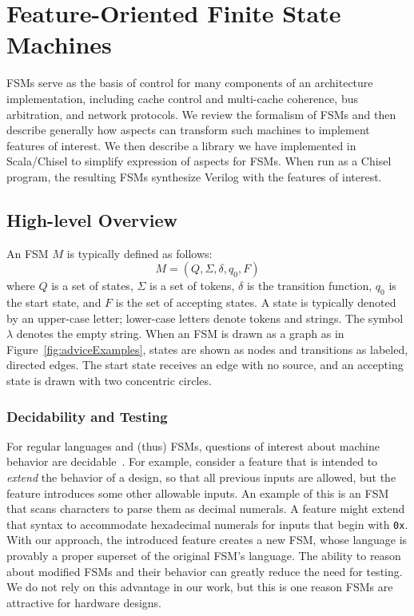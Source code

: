 \documentclass[conference]{IEEEtran}
\begin{document}
\section{Feature-Oriented Finite State Machines} \label{Sec:FSM}

FSMs serve as the basis of control for many components of an architecture implementation, including cache control and multi-cache coherence, bus arbitration, and network protocols.  We review the formalism of  FSMs and then describe generally how aspects can transform such machines to implement features of interest.  We then describe a library we have implemented in Scala/Chisel to simplify expression of aspects for FSMs.  When run as a Chisel program, the resulting FSMs synthesize Verilog with the features of interest.

\subsection{High-level Overview}
An FSM $M$ is typically defined as follows: 
\[M = (Q, \Sigma, \delta, q_0, F)\]where $Q$ is a set of states, $\Sigma$ is a set of tokens, $\delta$ is the transition function, $q_0$ is the start state, and $F$ is the set of accepting states.  A state is typically denoted by an upper-case letter;  lower-case letters denote tokens and strings.  The symbol $\lambda$ denotes the empty string.  When an FSM is drawn as a graph as in Figure~\ref{fig:adviceExamples}, states are shown as nodes and transitions as labeled, directed edges.  The start state receives an edge with no source, and an accepting state is drawn with two concentric circles. 

\subsubsection{Decidability and Testing}
For regular languages and (thus) FSMs, questions of interest about machine behavior are decidable~\cite{sipser}.    For example, consider a feature that is intended to \emph{extend} the behavior of a design, so that all previous inputs are allowed, but the feature introduces some other allowable inputs.
An example of this is an FSM that scans characters to parse them as decimal numerals.  A feature might extend that syntax to accommodate hexadecimal numerals for inputs that begin with \texttt{0x}.  With our approach, the introduced feature creates a new FSM, whose language is provably a proper superset of the original FSM's language.  
The ability to reason about modified FSMs and their behavior can greatly reduce the need for testing.  We do not rely on this advantage in our work, but this is one reason FSMs are attractive for hardware designs.
\end{document}
